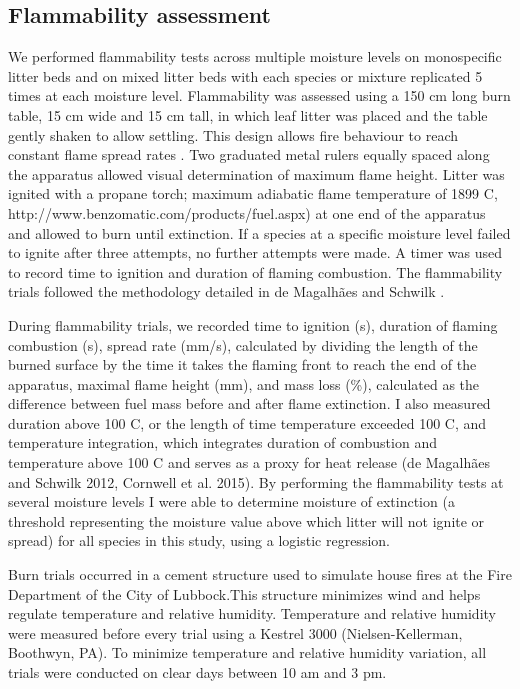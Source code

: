 \documentclass[fire,article,submit,moreauthors,pdftex]{Definitions/mdpi}
\begin{document}
\subsection{Flammability assessment}

We performed flammability tests across multiple moisture levels on monospecific litter beds and on mixed litter beds with each species or mixture replicated 5 times at each moisture level. Flammability was assessed using a 150 cm long burn table, 15 cm wide and 15 cm tall, in which leaf litter was placed and the table gently shaken to allow settling. This design allows fire behaviour to reach constant flame spread rates \cite{Magalhaes+Schwilk-2012}. Two graduated metal rulers   equally spaced along the apparatus allowed visual determination of maximum flame height.
Litter was ignited with a propane torch; maximum adiabatic flame temperature of 1899 C, http://www.benzomatic.com/products/fuel.aspx) at one end of the apparatus and allowed to burn until extinction. If a species at a specific moisture level failed to ignite after three attempts, no further attempts were made.  A timer was used to record time to ignition and duration of flaming combustion. The flammability trials followed the methodology detailed in de Magalhães and Schwilk \cite{Magalhaes+Schwilk-2012}. 

 
During flammability trials, we recorded time to ignition (s), duration of flaming combustion (s), spread rate (mm/s), calculated by dividing the length of the burned surface by the time it takes the flaming front to reach the end of the apparatus, maximal flame height (mm), and mass loss (\%), calculated as the difference between fuel mass before and after flame extinction. I also measured duration above 100 C, or the length of time temperature exceeded 100 C, and temperature integration, which integrates duration of combustion and temperature above 100 C and serves as a proxy for heat release (de Magalhães and Schwilk 2012, Cornwell et al. 2015). By performing the flammability tests at several moisture levels I were able to determine moisture of extinction (a threshold representing the moisture value above which litter will not ignite or spread) for all species in this study, using a logistic regression.

Burn trials occurred in a cement structure used to simulate house fires at the Fire Department of the City of Lubbock.This structure minimizes wind and helps regulate temperature and relative humidity. Temperature and relative humidity were measured before every trial using a Kestrel 3000 (Nielsen-Kellerman, Boothwyn, PA). To minimize temperature and relative humidity variation, all trials were conducted on clear days between 10 am and 3 pm. 
\end{document}
